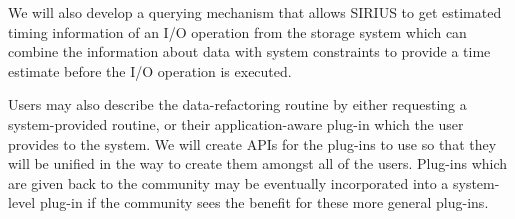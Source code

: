 We will also develop a querying mechanism that allows SIRIUS
to get estimated timing information of an I/O operation from the storage
system which can combine the information about data with system constraints
to provide a time estimate before the I/O operation is executed. 



Users may also describe the data-refactoring routine by either requesting a system-provided
routine, or their application-aware plug-in which the user provides to the system. We will
create APIs for the plug-ins to use so that they will be unified in the way to create them
amongst all of the users. Plug-ins which are given back to the community may be 
eventually incorporated into a system-level plug-in if the community sees the benefit for
these more general plug-ins.





